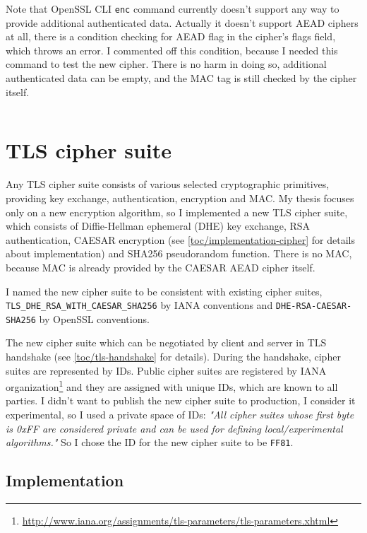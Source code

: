 \inputminted{text}{code/test-enc.sh.out}

Note that OpenSSL CLI \texttt{enc} command currently doesn't support any way to provide additional authenticated data. Actually it doesn't support AEAD ciphers at all, there is a condition checking for AEAD flag in the cipher's flags field, which throws an error. I commented off this condition, because I needed this command to test the new cipher. There is no harm in doing so, additional authenticated data can be empty, and the MAC tag is still checked by the cipher itself.

\inputminted{c}{code/openssl/apps/enc.c}


\section{TLS cipher suite}
\label{toc/implementation-cipher-suite}

Any TLS cipher suite consists of various selected cryptographic primitives, providing key exchange, authentication, encryption and MAC. My thesis focuses only on a new encryption algorithm, so I implemented a new TLS cipher suite, which consists of Diffie-Hellman ephemeral (DHE) key exchange, RSA authentication, CAESAR encryption (see \autoref{toc/implementation-cipher} for details about implementation) and SHA256 pseudorandom function. There is no MAC, because MAC is already provided by the CAESAR AEAD cipher itself.

I named the new cipher suite to be consistent with existing cipher suites, \texttt{TLS\_DHE\_RSA\_WITH\_CAESAR\_SHA256} by IANA conventions and \texttt{DHE-RSA-CAESAR-SHA256} by OpenSSL conventions.

The new cipher suite which can be negotiated by client and server in TLS handshake (see \autoref{toc/tls-handshake} for details). During the handshake, cipher suites are represented by IDs. Public cipher suites are registered by IANA organization\footnote{\url{http://www.iana.org/assignments/tls-parameters/tls-parameters.xhtml}} and they are assigned with unique IDs, which are known to all parties. I didn't want to publish the new cipher suite to production, I consider it experimental, so I used a private space of IDs: \textit{"All cipher suites whose first byte is 0xFF are considered private and can be used for defining local/experimental algorithms."} \cite[p.~55]{rfc2246} So I chose the ID for the new cipher suite to be \texttt{FF81}.

\subsection{Implementation}

